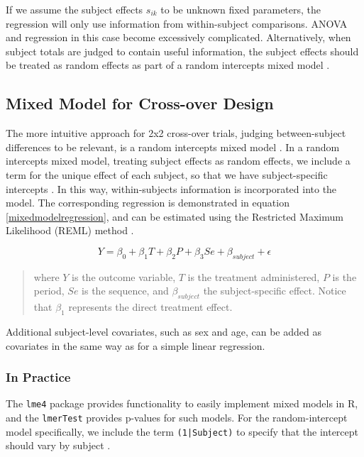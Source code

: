 \documentclass[12pt, TexShade, letterpaper]{report}
\begin{document}
If we assume the subject effects $s_{ik}$ to be unknown fixed parameters, the regression will only use information from within-subject comparisons. ANOVA and regression in this case become excessively complicated. Alternatively, when subject totals are judged to contain useful information, the subject effects should be treated as random effects as part of a random intercepts mixed model \cite{jones2003design}.

\subsection{Mixed Model for Cross-over Design}\label{mixed-model-subsection}
The more intuitive approach for 2x2 cross-over trials, judging between-subject differences to be relevant, is a random intercepts mixed model \cite{jones2003design}. In a random intercepts mixed model, treating subject effects as random effects, we include a term for the unique effect of each subject, so that we have subject-specific intercepts \cite{mixedmodelsR}. In this way, within-subjects information is incorporated into the model. The corresponding regression is demonstrated in equation \ref{mixedmodelregression}, and can be estimated using the Restricted Maximum Likelihood (REML) method \cite{jones2003design}.

\begin{equation}
   Y = \beta_0 + \beta_1 T + \beta_2 P + \beta_3 Se + \beta_{subject} + \epsilon
   \label{mixedmodelregression}
\end{equation}
\begin{quote}
    where $Y$ is the outcome variable, $T$ is the treatment administered, $P$ is the period, $Se$ is the sequence, and $\beta_{subject}$ the subject-specific effect. Notice that $\beta_1$ represents the direct treatment effect.
\end{quote}

Additional subject-level covariates, such as sex and age, can be added as covariates in the same way as for a simple linear regression.

\subsubsection{In Practice}
The \texttt{lme4} package provides functionality to easily implement mixed models in R, and the \texttt{lmerTest} provides p-values for such models. For the random-intercept model specifically, we include the term \texttt{(1|Subject)} to specify that the intercept should vary by subject \cite{mixedmodelsR}.
\end{document}
